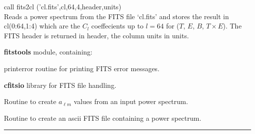 \begin{example}
{
call fits2cl ('cl.fits',cl,64,4,header,units)  \\
}
{
Reads a power spectrum from the FITS file `cl.fits' and stores the result in cl(0:64,1:4) which are the $C_l$ coeffecients up to $l=64$ for ($T$, $E$, $B$, $T\times E$). The FITS header is returned in header, the column units in units.
}
\end{example}
\begin{modules}
  \begin{sulist}{} %
  \item[\textbf{fitstools}] module, containing:
  \item[printerror] routine for printing FITS error messages.
  \item[\textbf{cfitsio}] library for FITS file handling.		
  \end{sulist}
\end{modules}

\begin{related}
  \begin{sulist}{} %
  \item[\htmlref{create\_alm}{sub:create_alm}] Routine to create $a_{\ell m}$ values
  from an input power spectrum.
  \item[\htmlref{write\_asctab}{sub:write_asctab}] Routine to create an ascii
  FITS file containing a power spectrum.
  \end{sulist}
\end{related}

\rule{\hsize}{2mm}

\newpage
